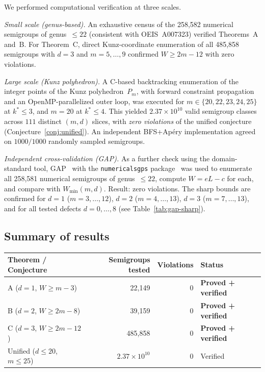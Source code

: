 \documentclass[11pt]{amsart}
\theoremstyle{definition}
\theoremstyle{remark}
\begin{document}
We performed computational verification at three scales.

\emph{Small scale (genus-based).}  An exhaustive census of the 258{,}582
numerical semigroups of genus~$\le 22$ (consistent with OEIS~A007323)
verified Theorems~A and~B.  For Theorem~C, direct Kunz-coordinate
enumeration of all 485{,}858 semigroups with $d = 3$ and $m = 5, \ldots, 9$
confirmed $W \ge 2m - 12$ with zero violations.

\emph{Large scale (Kunz polyhedron).}  A C-based backtracking enumeration
of the integer points of the Kunz polyhedron~$P_m$, with forward
constraint propagation and an OpenMP-parallelized outer loop, was
executed for $m \in \{20, 22, 23, 24, 25\}$ at $k^* \le 3$, and
$m = 20$ at $k^* \le 4$.  This yielded $2.37 \times 10^{10}$
valid semigroup classes across $111$ distinct $(m,d)$ slices,
with \emph{zero violations} of the unified conjecture
(Conjecture~\ref{conj:unified}).
An independent BFS+Ap\'ery implementation agreed on $1000/1000$
randomly sampled semigroups.

\emph{Independent cross-validation (GAP).}
As a further check using the domain-standard tool,
GAP~\cite{GAP} with the \texttt{numericalsgps} package~\cite{NumericalSgps}
was used to enumerate all 258{,}581 numerical semigroups of genus~$\le 22$,
compute $W = eL - c$ for each, and compare with $W_{\min}(m,d)$.
Result: zero violations.  The sharp bounds are confirmed for
$d = 1$ ($m = 3, \ldots, 12$),
$d = 2$ ($m = 4, \ldots, 13$),
$d = 3$ ($m = 7, \ldots, 13$),
and for all tested defects $d = 0, \ldots, 8$
(see Table~\ref{tab:gap-sharp}).

\subsection{Summary of results}

\begin{center}
\begin{tabular}{lrrl}
\toprule
\textbf{Theorem / Conjecture} & \textbf{Semigroups tested} & \textbf{Violations} & \textbf{Status} \\
\midrule
A ($d = 1$, $W \ge m - 3$)  & 22{,}149 & 0 & \textbf{Proved + verified} \\
B ($d = 2$, $W \ge 2m - 8$) & 39{,}159 & 0 & \textbf{Proved + verified} \\
C ($d = 3$, $W \ge 2m - 12$)  & 485{,}858 & 0 & \textbf{Proved + verified} \\
Unified ($d \le 20$, $m \le 25$) & $2.37 \times 10^{10}$ & 0 & Verified \\
\bottomrule
\end{tabular}
\end{center}
\end{document}
